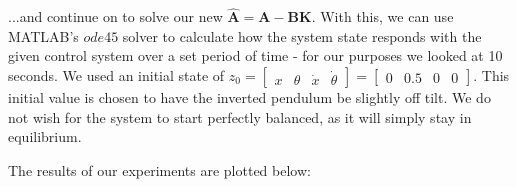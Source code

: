 \documentclass{article}
\begin{document}
\noindent...and continue on to solve our new $\hat{\boldsymbol{A}} = \boldsymbol{A} - \boldsymbol{B}\boldsymbol{K}$. With this, we can use MATLAB's $ode45$ solver to calculate how the system state responds with the given control system over a set period of time - for our purposes we looked at 10 seconds. We used an initial state of $z_0=\begin{bmatrix}x & \theta & \dot{x} & \dot{\theta} \end{bmatrix}=\begin{bmatrix} 0 & 0.5 & 0 & 0 \end{bmatrix}$. This initial value is chosen to have the inverted pendulum be slightly off tilt. We do not wish for the system to start perfectly balanced, as it will simply stay in equilibrium.

The results of our experiments are plotted below:
\end{document}
